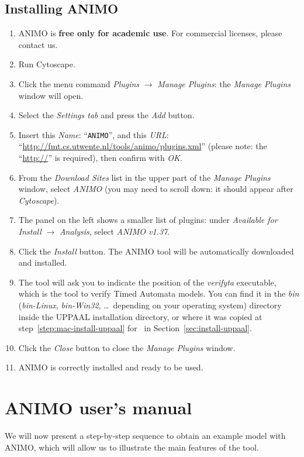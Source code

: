 \subsection{Installing ANIMO}\label{sec:install-animo}
\begin{enumerate}
\item ANIMO is {\bfseries free only for academic use}. For commercial licenses, please contact us.
\item Run Cytoscape.
\item Click the menu command \emph{Plugins} $\rightarrow$ \emph{Manage Plugins}: the \emph{Manage Plugins}
window will open.
\item Select the \emph{Settings tab} and press the \emph{Add} button.
\item Insert this \emph{Name}: ``{\tt ANIMO}'', and this \emph{URL}:
``\url{http://fmt.cs.utwente.nl/tools/animo/plugins.xml}''
(please note: the ``\url{http://}'' is required), then confirm with \emph{OK}.
\item From the \emph{Download Sites} list in the upper part of the \emph{Manage Plugins} window, select \emph{ANIMO}
(you may need to scroll down: it should appear after \emph{Cytoscape}).
\item The panel on the left shows a smaller list of plugins: under \emph{Available for Install} $\rightarrow$
\emph{Analysis},
select \emph{ANIMO v1.37}.
\item Click the \emph{Install} button. The ANIMO tool will be automatically downloaded and installed.
\item The tool will ask you to indicate the position of the \emph{verifyta} executable, which is the tool to verify Timed Automata models.
You can find it in the \emph{bin} (\emph{bin-Linux}, \emph{bin-Win32}, \dots\ depending on your operating system) directory inside the
UPPAAL installation directory, or where it was copied at step~\ref{step:mac-install-uppaal} for \macsymbol\ in Section~\ref{sec:install-uppaal}.
\item Click the \emph{Close} button to close the \emph{Manage Plugins} window.
\item ANIMO is correctly installed and ready to be used.
\end{enumerate}

\clearpage
\section{ANIMO user's manual}\label{sec:animo-manual}
We will now present a step-by-step sequence to obtain an example model
with ANIMO, which will allow us to illustrate the main features of the tool.


